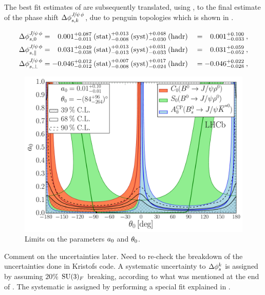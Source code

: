 The best fit estimates of  are subsequently translated, using ,
to the final estimate of the phase shift $\Delta\phi^{{J\mskip -3mu/\mskip -2mu\psi\mskip 2mu}\phi}_{s,{k}}$, due to penguin topologies which is shown in .

\begin{alignat}{2}
\DeltaPhisJpsiPhi{0} & =
\phantom{-}0.001^{+0.087}_{-0.011}\:\text{(stat)}^{+0.013}_{-0.008}\:\text{(syst)}^{+0.048}_{-0.030}\:(\text{hadr})
&& = \phantom{-}0.001^{+0.100}_{-0.033}\:,\\
%
\DeltaPhisJpsiPhi{\parallel} & =
\phantom{-}0.031^{+0.049}_{-0.038}\:\text{(stat)}^{+0.013}_{-0.013}\:\text{(syst)}^{+0.031}_{-0.033}\:(\text{hadr})
&& = \phantom{-}0.031^{+0.059}_{-0.052}\:,\\
%
\DeltaPhisJpsiPhi{\perp} & =
-0.046^{+0.012}_{-0.012}\:\text{(stat)}^{+0.007}_{-0.008}\:\text{(syst)}^{+0.017}_{-0.024}\:(\text{hadr})
&& = -0.046^{+0.022}_{-0.028}\:,
\label{delta_phis_result}
\end{alignat}

\begin{figure}[!t]
  \centering
  \includegraphics[trim=0.0cm 0.0cm 0.0cm 0.0cm, clip=true,scale=0.33]{Figures/Chapter5/Penguin_Contribution_Ang_vs_Abs_allB2VV_Long.pdf}
  \caption{Limits on the parameters $a_{0}$ and $\theta_{0}$. }
  \label{pengPlot_long}
\end{figure}

{\color{red} Comment on the uncertainties later. Need to re-check the breakdown of the uncertainties done in Kristofs code.}
A systematic uncertainty to $\Delta\phi_{s}^{k}$ is assigned by assuming $20\%$ $\mathrm{SU}(3)_F$ breaking,
according to what was mentioned at the end of . The systematic is assigned
by performing a special fit explained in .

